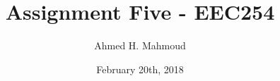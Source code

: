 \documentclass[12pt] {article}
\begin{document}
\title{Assignment Five -  EEC254}
\author{Ahmed H. Mahmoud}
\date{February 20th, 2018}
\maketitle


\end{document}
